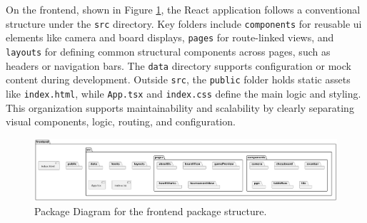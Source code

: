 \newpage

On the frontend, shown in Figure \ref{fig:package-frontend}, the React application follows a conventional structure under the \texttt{src} directory. Key folders include \texttt{components} for reusable \gls{ui} elements like camera and board displays, \texttt{pages} for route-linked views, and \texttt{layouts} for defining common structural components across pages, such as headers or navigation bars. The \texttt{data} directory supports configuration or mock content during development. Outside \texttt{src}, the \texttt{public} folder holds static assets like \texttt{index.html}, while \texttt{App.tsx} and \texttt{index.css} define the main logic and styling. This organization supports maintainability and scalability by clearly separating visual components, logic, routing, and configuration.

\begin{figure}[h!]
    \centering
    \includegraphics[width=\linewidth]{figures/results/uml/package-frontend.png}
    \caption[Package Diagram for Frontend]{Package Diagram for the frontend package structure.}
    \label{fig:package-frontend}
\end{figure}

\newpage

